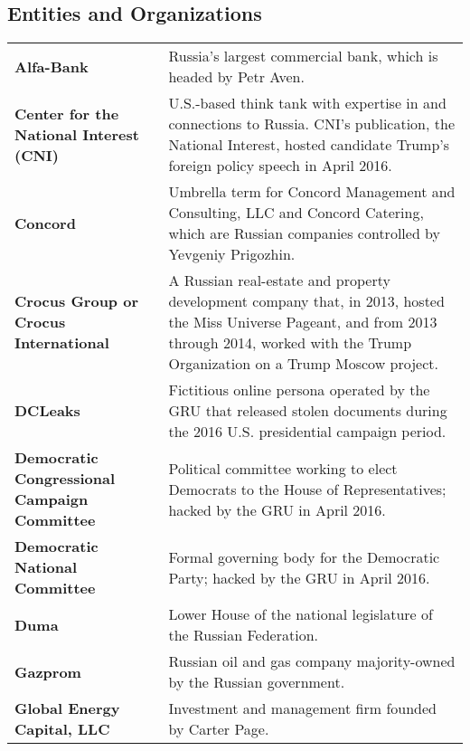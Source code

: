 \subsection{Entities and Organizations}

\begin{longtable}{ p{} p{} }

    \textbf{Alfa-Bank} & Russia’s largest commercial bank, which is headed by Petr Aven. \\

    \textbf{Center for the National Interest (CNI)} & U.S.-based think tank with expertise in and connections to Russia. CNI’s publication, the National Interest, hosted candidate Trump’s foreign policy speech in April 2016. \\

    \textbf{Concord} & Umbrella term for Concord Management and Consulting, LLC and Concord Catering, which are Russian companies controlled by Yevgeniy Prigozhin. \\

    \textbf{Crocus Group or Crocus International} & A Russian real-estate and property development company that, in 2013, hosted the Miss Universe Pageant, and from 2013 through 2014, worked with the Trump Organization on a Trump Moscow project. \\

    \textbf{DCLeaks} & Fictitious online persona operated by the GRU that released stolen documents during the 2016 U.S. presidential campaign period. \\

    \textbf{Democratic Congressional Campaign Committee} & Political committee working to elect Democrats to the House of Representatives; hacked by the GRU in April 2016. \\

    \textbf{Democratic National Committee} & Formal governing body for the Democratic Party; hacked by the GRU in April 2016. \\

    \textbf{Duma} & Lower House of the national legislature of the Russian Federation. \\

    \textbf{Gazprom} & Russian oil and gas company majority-owned by the Russian government. \\

    \textbf{Global Energy Capital, LLC} & Investment and management firm founded by Carter Page. \\


\end{longtable}
